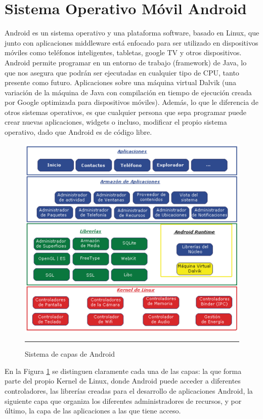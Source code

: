 \section{Sistema Operativo Móvil Android}

Android es un sistema operativo y una plataforma software, basado en Linux, que junto con aplicaciones middleware está enfocado para ser utilizado en dispositivos móviles como teléfonos inteligentes, tabletas, google TV y otros dispositivos. Android permite programar en un entorno de trabajo (framework) de Java, lo que nos asegura que podrán ser ejecutadas en cualquier tipo de CPU, tanto presente como futuro. Aplicaciones sobre una máquina virtual Dalvik (una variación de la máquina de Java con compilación en tiempo de ejecución creada por Google optimizada para dispositivos móviles). Además, lo que le diferencia de otros sistemas operativos, es que cualquier persona que sepa programar puede crear nuevas aplicaciones, widgets o incluso, modificar el propio sistema operativo, dado que Android es de código libre. \cite{Android}

\begin{figure}[htbp]
	\centering
		\includegraphics[width=1\textwidth]{Figuras/capasAndroid.png}
		\rule{30em}{0.5pt}
	\caption[Sistema de capas de Android]{Sistema de capas de Android}
	\label{fig:capasAndroid}
\end{figure}

En la Figura \ref{fig:capasAndroid} se distinguen claramente cada una de las capas: la que forma parte del propio Kernel de Linux, donde Android puede acceder a diferentes controladores, las librerías creadas para el desarrollo de aplicaciones Android, la siguiente capa que organiza los diferentes administradores de recursos, y por último, la capa de las aplicaciones a las que tiene acceso.

